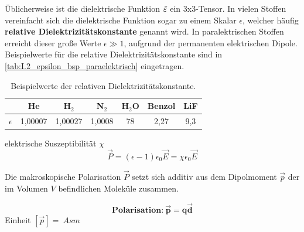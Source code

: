     Üblicherweise ist die dielektrische Funktion $\tilde{\varepsilon}$ ein 3x3-Tensor. In vielen Stoffen vereinfacht sich die dielektrische Funktion sogar zu einem Skalar $\epsilon$, welcher häufig \textbf{relative Dielektrizitätskonstante} genannt wird. In paralektrischen Stoffen erreicht dieser große Werte $\epsilon\gg1$, aufgrund der permanenten elektrischen Dipole. Beispielwerte für die relative Dielektrizitätskonstante sind in \autoref{tab:I.2_epsilon_bsp_paraelektrisch} eingetragen.
    \begin{table}[H]
        \centering
        \caption{Beispielwerte der relativen Dielektrizitätskonstante.}
        \begin{tabular}{|l||cccccc|}\hline
             &He&H${}_2$&N${}_2$&H${}_2$O&Benzol&LiF \\\hline
             $\epsilon$&1,00007&1,00027&1,0008&78&2,27&9,3\\\hline
        \end{tabular}
        \label{tab:I.2_epsilon_bsp_paraelektrisch}
    \end{table}
    \begin{definition}{elektrische Suszeptibilität $\chi$}
        \begin{equation}
            \vec P = (\epsilon-1)\epsilon_0\vec E = \chi\epsilon_0\vec E
            \label{eq:2.3}
        \end{equation}
    \end{definition}
    Die makroskopische Polarisation $\vec P$ setzt sich additiv aus dem Dipolmoment $\vec p$ der im Volumen $V$ befindlichen Moleküle zusammen.\\
    \begin{minipage}{0.6\linewidth}\vspace{3em}\hspace{1em}
        \centering
        
        \label{fig:vl02_dipol}
    \end{minipage}
    \begin{minipage}{0.4\linewidth}
        \begin{important}
            \begin{equation}
                \textbf{Polarisation:}~\bm{\vec p= q\vec d}
            \end{equation}
            Einheit $[\vec p]=\SI{}{Asm}$
        \end{important}
    \end{minipage}

